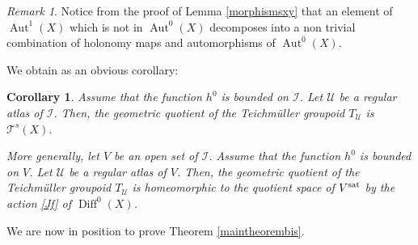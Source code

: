 \documentclass[10pt]{amsart}
\let\mathcal\mathscr
\DeclareMathOperator{\Aut}{Aut}
\DeclareMathOperator{\Diff}{Diff}
\theoremstyle{plain}
\newtheorem{corollary}[theorem]{Corollary}
\theoremstyle{definition}
\theoremstyle{remark}
\newtheorem{remark}[theorem]{Remark}
\numberwithin{equation}{section}
\newcommand{\D}{\Diff^0(X)}
\newcommand{\cI}{\mathcal{I}}
\begin{document}
\begin{remark}
\label{Aut10}
Notice from the proof of Lemma \ref{morphismsxy} that an element of $\Aut^1(X)$ which is not in $\Aut^0(X)$ decomposes into a non trivial combination of holonomy maps and automorphisms of $\Aut^0(X)$.
\end{remark}

We obtain as an obvious corollary:

\begin{corollary}
\label{geoquotient}
Assume that the function $h^0$ is bounded on $\cI$. Let $\mathcal U$ be a regular atlas of $\cI$. Then, the geometric quotient of the Teichmüller groupoid $T_{\mathcal U}$ is $\mathcal T^s(X)$.

More generally, let $V$ be an open set of $\cI$. Assume that the function $h^0$ is bounded on $V$. Let $\mathcal U$ be a regular atlas of $V$. Then, the geometric quotient of the Teichmüller groupoid $T_{\mathcal U}$ is homeomorphic to the quotient space of $V^{\textup{sat}}$ by the action \eqref{Jf} of $\D$.
\end{corollary}

We are now in position to prove Theorem \ref{maintheorembis}.
\end{document}
